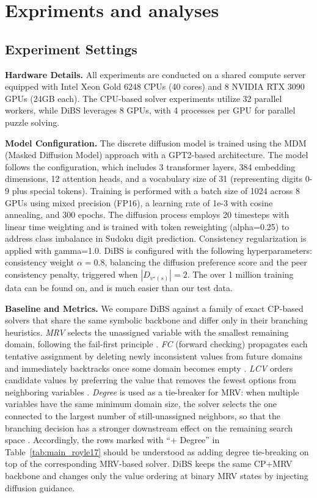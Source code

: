 \documentclass[lettersize,journal]{IEEEtran}
\begin{document}
\section{Expriments and analyses}
\label{Expriments}

\subsection{Experiment Settings}
\textbf{Hardware Details.} All experiments are conducted on a shared compute server equipped with Intel Xeon Gold 6248 CPUs (40 cores) and 8 NVIDIA RTX 3090 GPUs (24GB each). The CPU-based solver experiments utilize 32 parallel workers, while DiBS leverages 8 GPUs, with 4 processes per GPU for parallel puzzle solving.

\textbf{Model Configuration.} The discrete diffusion model is trained using the MDM (Masked Diffusion Model) approach with a GPT2-based architecture. The model follows the configuration, which includes 3 transformer layers, 384 embedding dimensions, 12 attention heads, and a vocabulary size of 31 (representing digits 0-9 plus special tokens). Training is performed with a batch size of 1024 across 8 GPUs using mixed precision (FP16), a learning rate of 1e-3 with cosine annealing, and 300 epochs. The diffusion process employs 20 timesteps with linear time weighting and is trained with token reweighting (alpha=0.25) to address class imbalance in Sudoku digit prediction. Consistency regularization is applied with gamma=1.0. DiBS is configured with the following hyperparameters: consistency weight $\alpha=0.8$, balancing the diffusion preference score and the peer consistency penalty, triggered when $|D_{v^\star(s)}| = 2$. The over 1 million training data can be found on\cite{park2016sudoku}, and is much easier than our test data.

\textbf{Baseline and Metrics.} We compare DiBS against a family of exact CP-based solvers that share the same symbolic backbone and differ only in their branching heuristics.
\textit{MRV} selects the unassigned variable with the smallest remaining domain, following the fail-first principle \cite{haralick1980increasing,freuder1982sufficient}.
\textit{FC} (forward checking) propagates each tentative assignment by deleting newly inconsistent values from future domains and immediately backtracks once some domain becomes empty \cite{haralick1980increasing}.
\textit{LCV} orders candidate values by preferring the value that removes the fewest options from neighboring variables \cite{haralick1980increasing}.
\textit{Degree} is used as a tie-breaker for MRV: when multiple variables have the same minimum domain size, the solver selects the one connected to the largest number of still-unassigned neighbors, so that the branching decision has a stronger downstream effect on the remaining search space \cite{dechter1987network}.
Accordingly, the rows marked with ``+ Degree'' in Table~\ref{tab:main_royle17} should be understood as adding degree tie-breaking on top of the corresponding MRV-based solver.
DiBS keeps the same CP+MRV backbone and changes only the value ordering at binary MRV states by injecting diffusion guidance.
\end{document}
